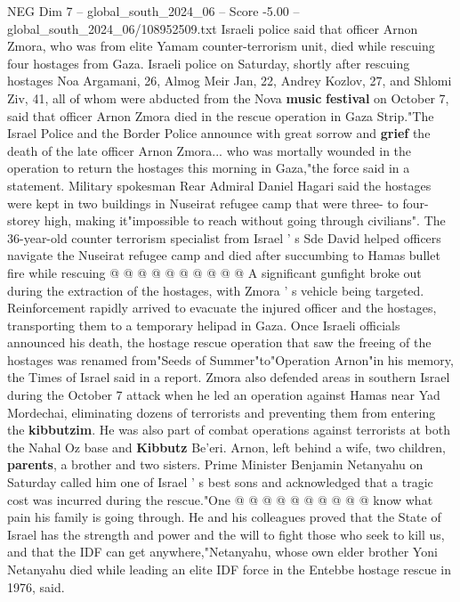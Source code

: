 \begin{textsample}{NEG Dim 7 – global\_south\_2024\_06 – Score -5.00 – global\_south\_2024\_06/108952509.txt}  \label{ex:f7_neg_367}
Israeli police said that officer Arnon Zmora, who was from elite Yamam counter-terrorism unit, died while rescuing four hostages from Gaza.
Israeli police on Saturday, shortly after rescuing hostages Noa Argamani, 26, Almog Meir Jan, 22, Andrey Kozlov, 27, and Shlomi Ziv, 41, all of whom were abducted from the Nova \textbf{music} \textbf{festival} on October 7, said that officer Arnon Zmora died in the rescue operation in Gaza Strip."The Israel Police and the Border Police announce with great sorrow and \textbf{grief} the death of the late officer Arnon Zmora... who was mortally wounded in the operation to return the hostages this morning in Gaza,"the force said in a statement.
Military spokesman Rear Admiral Daniel Hagari said the hostages were kept in two buildings in Nuseirat refugee camp that were three- to four-storey high, making it"impossible to reach without going through civilians".
The 36-year-old counter terrorism specialist from Israel ' s Sde David helped officers navigate the Nuseirat refugee camp and died after succumbing to Hamas bullet fire while rescuing @ @ @ @ @ @ @ @ @ @ A significant gunfight broke out during the extraction of the hostages, with Zmora ' s vehicle being targeted.
Reinforcement rapidly arrived to evacuate the injured officer and the hostages, transporting them to a temporary helipad in Gaza.
Once Israeli officials announced his death, the hostage rescue operation that saw the freeing of the hostages was renamed from"Seeds of Summer"to"Operation Arnon"in his memory, the Times of Israel said in a report.
Zmora also defended areas in southern Israel during the October 7 attack when he led an operation against Hamas near Yad Mordechai, eliminating dozens of terrorists and preventing them from entering the \textbf{kibbutzim}.
He was also part of combat operations against terrorists at both the Nahal Oz base and \textbf{Kibbutz} Be'eri.
Arnon, left behind a wife, two children, \textbf{parents}, a brother and two sisters.
Prime Minister Benjamin Netanyahu on Saturday called him one of Israel ' s best sons and acknowledged that a tragic cost was incurred during the rescue."One @ @ @ @ @ @ @ @ @ @ know what pain his family is going through.
He and his colleagues proved that the State of Israel has the strength and power and the will to fight those who seek to kill us, and that the IDF can get anywhere,"Netanyahu, whose own elder brother Yoni Netanyahu died while leading an elite IDF force in the Entebbe hostage rescue in 1976, said.

\end{textsample}
